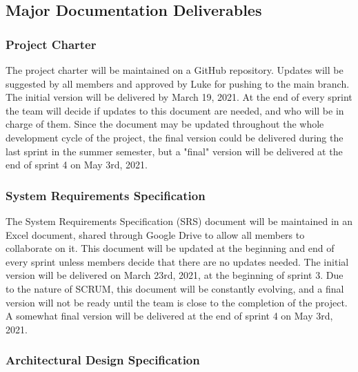 
\subsection{Major Documentation Deliverables}

\subsubsection{Project Charter}

The project charter will be maintained on a GitHub repository. Updates will be suggested by all members and approved by Luke for pushing to the main branch. The initial version will be delivered by March 19, 2021. At the end of every sprint the team will decide if updates to this document are needed, and who will be in charge of them. Since the document may be updated throughout the whole development cycle of the project, the final version could be delivered during the last sprint in the summer semester, but a "final" version will be delivered at the end of sprint 4 on May 3rd, 2021.

\subsubsection{System Requirements Specification}


The System Requirements Specification (SRS) document will be maintained in an Excel document, shared through Google Drive to allow all members to collaborate on it. This document will be updated at the beginning and end of every sprint unless members decide that there are no updates needed. The initial version will be delivered on March 23rd, 2021, at the beginning of sprint 3. Due to the nature of SCRUM, this document will be constantly evolving, and a final version will not be ready until the team is close to the completion of the project. A somewhat final version will be delivered at the end of sprint 4 on May 3rd, 2021.

\subsubsection{Architectural Design Specification}

